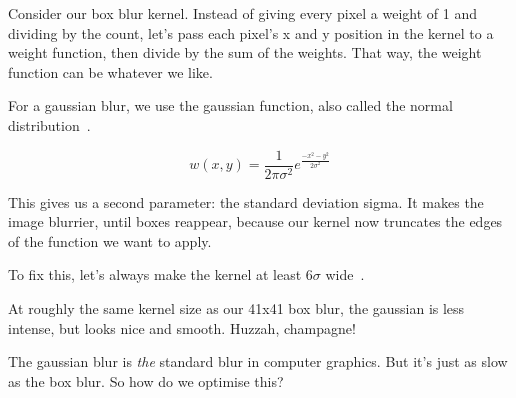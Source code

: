 \documentclass{article}
\begin{document}
Consider our box blur kernel. Instead of giving every pixel a weight of 1 and dividing by the count, let's pass each pixel's x and y position in the kernel to a weight function, then divide by the sum of the weights. That way, the weight function can be whatever we like.

For a gaussian blur, we use the gaussian function, also called the normal distribution~\cite{web:wikipedia-gaussian-blur}.

\[
    w(x, y) = \frac{1}{2 \pi \sigma^2} e^{\frac{- x^2 - y^2}{2 \sigma^2}}
\]

This gives us a second parameter: the standard deviation sigma. It makes the image blurrier, until boxes reappear, because our kernel now truncates the edges of the function we want to apply.

To fix this, let's always make the kernel at least $6\sigma$ wide~\cite{web:dspse-gaussian-kernel}.

At roughly the same kernel size as our 41x41 box blur, the gaussian is less intense, but looks nice and smooth. Huzzah, champagne! %

The gaussian blur is \textit{the} standard blur in computer graphics. But it's just as slow as the box blur. So how do we optimise this?
\end{document}
